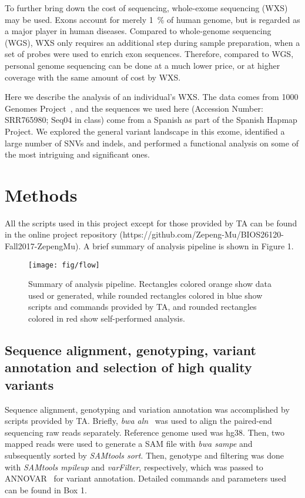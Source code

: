 \documentclass[a4paper, 12pt]{article}
\begin{document}
			To further bring down the cost of sequencing, whole-exome sequencing (WXS) may be used. Exons account for merely 1~\% of human genome, but is regarded as a major player in human diseases. Compared to whole-genome sequencing (WGS), WXS only requires an additional step during sample preparation, when a set of probes were used to enrich exon sequences. Therefore, compared to WGS, personal genome sequencing can be done at a much lower price, or at higher coverage with the same amount of cost by WXS.
			
			Here we describe the analysis of an individual's WXS. The data comes from 1000 Genomes Project~\parencite{Auton2015}, and the sequences we used here (Accession Number: SRR765980; Seq04 in class) come from a Spanish as part of the Spanish Hapmap Project. We explored the general variant landscape in this exome, identified a large number of SNVs and indels, and performed a functional analysis on some of the most intriguing and significant ones.
			 
		\section*{Methods}
		
			All the scripts used in this project except for those provided by TA can be found in the online project repository (https://github.com/Zepeng-Mu/BIOS26120-Fall2017-ZepengMu). A brief summary of analysis pipeline is shown in Figure 1.
			
			\begin{figure*}
				\captionsetup{singlelinecheck=false, justification=raggedright, labelsep=period}
				\centering
				\texttt{[image: fig/flow]}
				\caption[]{Summary of analysis pipeline. Rectangles colored orange show data used or generated, while rounded rectangles colored in blue show scripts and commands provided by TA, and rounded rectangles colored in red show self-performed analysis.}
			\end{figure*}
		
			\subsection*{Sequence alignment, genotyping, variant annotation and selection of high quality variants}
			
				Sequence alignment, genotyping and variation annotation was accomplished by scripts provided by TA. Briefly, \textit{bwa aln}~\parencite{Li2009} was used to align the paired-end sequencing raw reads separately. Reference genome used was hg38. Then, two mapped reads were used to generate a SAM file with \textit{bwa sampe} and subsequently sorted by \textit{SAMtools sort}. Then, genotype and filtering was done with \textit{SAMtools mpileup} and \textit{varFilter}, respectively, which was passed to ANNOVAR~\parencite{Chang2012} for variant annotation. Detailed commands and parameters used can be found in Box 1.
				
\end{document}
